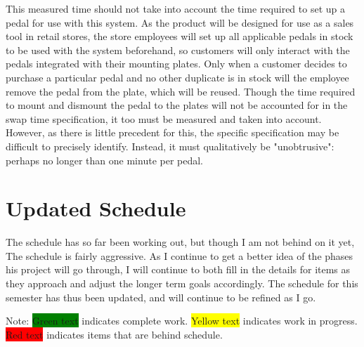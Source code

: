 \documentclass{article}
\begin{document}
	This measured time should not take into account the time required to set up a pedal for use with this system.  As the product will be designed for use as a sales tool in retail stores, the store employees will set up all applicable pedals in stock to be used with the system beforehand, so customers will only interact with the pedals integrated with their mounting plates.  Only when a customer decides to purchase a particular pedal and no other duplicate is in stock will the employee remove the pedal from the plate, which will be reused.  Though the time required to mount and dismount the pedal to the plates will not be accounted for in the swap time specification, it too must be measured and taken into account.  However, as there is little precedent for this, the specific specification may be difficult to precisely identify.  Instead, it must qualitatively be "unobtrusive": perhaps no longer than one minute per pedal.

\section{Updated Schedule}

The schedule has so far been working out, but though I am not behind on it yet, The schedule is fairly aggressive.  As I continue to get a better idea of the phases his project will go through, I will continue to both fill in the details for items as they approach and adjust the longer term goals accordingly.  The schedule for this semester has thus been updated, and will continue to be refined as I go.

Note: \colorbox{green}{Green text} indicates complete work.  \colorbox{yellow}{Yellow text} indicates work in progress.  \colorbox{red}{Red text} indicates items that are behind schedule.
\end{document}
